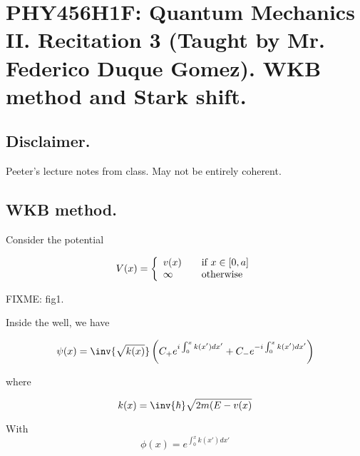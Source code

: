 
%

\chapter{PHY456H1F: Quantum Mechanics II.  Recitation 3 (Taught by Mr. Federico Duque Gomez).  WKB method and Stark shift.}
\label{chap:qmTwoR3}
{}
\date{Oct 28, 2011}

\beginArtWithToc

\section{Disclaimer.}

Peeter's lecture notes from class.  May not be entirely coherent.

\section{WKB method.}

Consider the potential

\begin{equation}\label{eqn:qmTwoR3:10}
V(x) = 
\left\{
\begin{array}{l l}
v(x) & \quad \mbox{if $x \in [0,a]$} \\
\infty & \quad \mbox{otherwise} \\
\end{array}
\right.
\end{equation}

FIXME: fig1.

Inside the well, we have

\begin{equation}\label{eqn:qmTwoR3:30}
\psi(x) = \inv{\sqrt{k(x)}} \left( 
C_{+} e^{i \int_0^x k(x') dx'}
+C_{-} e^{-i \int_0^x k(x') dx'}
\right)
\end{equation}

where

\begin{equation}\label{eqn:qmTwoR3:50}
k(x) = \inv{\hbar} \sqrt{ 2m( E - v(x) }
\end{equation}

With
\begin{equation}\label{eqn:qmTwoR3:70}
\phi(x) = e^{\int_0^x k(x') dx'}
\end{equation}

